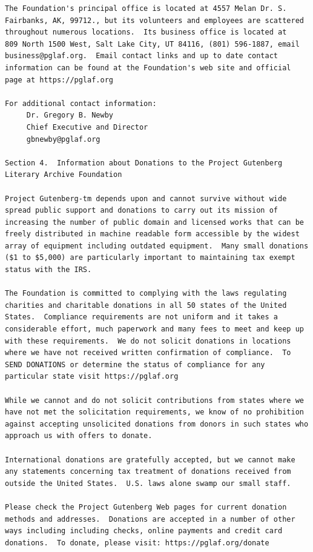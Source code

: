 \documentclass{book}
\begin{document}
\begin{verbatim}
The Foundation's principal office is located at 4557 Melan Dr. S.
Fairbanks, AK, 99712., but its volunteers and employees are scattered
throughout numerous locations.  Its business office is located at
809 North 1500 West, Salt Lake City, UT 84116, (801) 596-1887, email
business@pglaf.org.  Email contact links and up to date contact
information can be found at the Foundation's web site and official
page at https://pglaf.org

For additional contact information:
     Dr. Gregory B. Newby
     Chief Executive and Director
     gbnewby@pglaf.org

Section 4.  Information about Donations to the Project Gutenberg
Literary Archive Foundation

Project Gutenberg-tm depends upon and cannot survive without wide
spread public support and donations to carry out its mission of
increasing the number of public domain and licensed works that can be
freely distributed in machine readable form accessible by the widest
array of equipment including outdated equipment.  Many small donations
($1 to $5,000) are particularly important to maintaining tax exempt
status with the IRS.

The Foundation is committed to complying with the laws regulating
charities and charitable donations in all 50 states of the United
States.  Compliance requirements are not uniform and it takes a
considerable effort, much paperwork and many fees to meet and keep up
with these requirements.  We do not solicit donations in locations
where we have not received written confirmation of compliance.  To
SEND DONATIONS or determine the status of compliance for any
particular state visit https://pglaf.org

While we cannot and do not solicit contributions from states where we
have not met the solicitation requirements, we know of no prohibition
against accepting unsolicited donations from donors in such states who
approach us with offers to donate.

International donations are gratefully accepted, but we cannot make
any statements concerning tax treatment of donations received from
outside the United States.  U.S. laws alone swamp our small staff.

Please check the Project Gutenberg Web pages for current donation
methods and addresses.  Donations are accepted in a number of other
ways including including checks, online payments and credit card
donations.  To donate, please visit: https://pglaf.org/donate



\end{verbatim}
\end{document}
